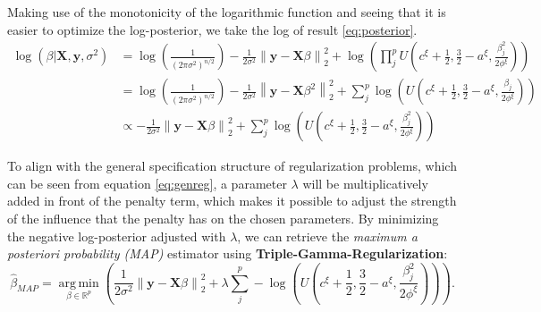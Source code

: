 \documentclass[12pt,a4paper]{article}
\newcommand{\norm}[1]{\left\lVert#1\right\rVert}
\DeclareMathOperator*{\argmin}{arg\,min}
\begin{document}
Making use of the monotonicity of the logarithmic function and seeing that it is easier to optimize the log-posterior, we take the log of result \ref{eq:posterior}. 
\begin{align}
\log(\beta| \mathbf{X}, \mathbf{y}, \sigma^2) 	&= \log\left(\frac{1}{(2\pi\sigma^2)^{n/2}}\right) - \frac{1}{2\sigma^2}\norm{\mathbf{y} - \mathbf{X}\beta}_2^2 + \log\left(\prod_j^p U\left(c^\xi + \frac{1}{2}, \frac{3}{2}-a^\xi, \frac{\beta_j^2}{2\phi^\xi}\right)\right)\nonumber\\
							&= \log\left(\frac{1}{(2\pi\sigma^2)^{n/2}}\right) - \frac{1}{2\sigma^2}\norm{\mathbf{y} - \mathbf{X}\beta^2}_2^2 + \sum_j^p \log\left(U\left(c^\xi + \frac{1}{2}, \frac{3}{2}-a^\xi, \frac{\beta_j}{2\phi^\xi}\right)\right)\nonumber\\
							&\propto -\frac{1}{2\sigma^2}\norm{\mathbf{y} - \mathbf{X}\beta}_2^2 + \sum_j^p \log\left(U\left(c^\xi + \frac{1}{2}, \frac{3}{2}-a^\xi, \frac{\beta_j^2}{2\phi^\xi}\right)\right)\nonumber
\end{align}

To align with the general specification structure of regularization problems, which can be seen from equation \ref{eq:genreg}, a parameter $\lambda$ will be multiplicatively added in front of the penalty term, which makes it possible to adjust the strength of the influence that the penalty has on the chosen parameters. By minimizing the negative log-posterior adjusted with $\lambda$, we can retrieve the \textit{maximum a posteriori probability (MAP)} estimator using \textbf{Triple-Gamma-Regularization}:
\begin{equation}\label{eq:tgr}
\hat{\beta}_{MAP} = \underset{\beta \in \mathbb{R}^p}{\argmin} \left(\frac{1}{2\sigma^2}\norm{\mathbf{y} - \mathbf{X}\beta}_2^2 + \lambda \sum_j^p -\log\left(U\left(c^\xi + \frac{1}{2}, \frac{3}{2}-a^\xi, \frac{\beta_j^2}{2\phi^\xi}\right)\right)\right). 
\end{equation}

\newpage
\end{document}
